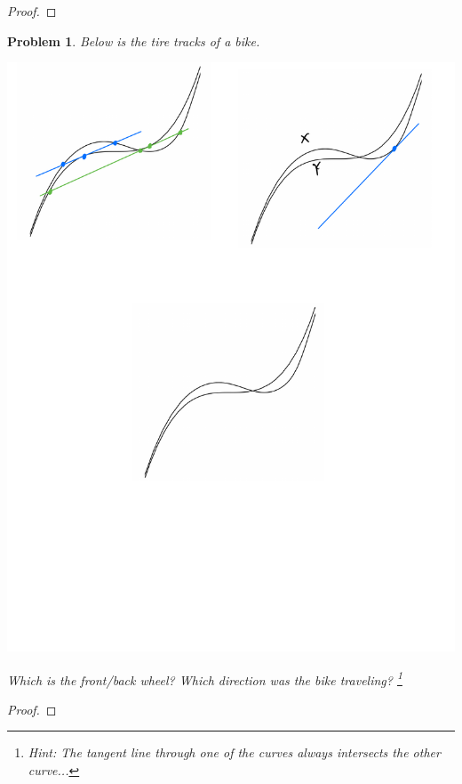\documentclass[11pt]{article}
\newtheorem{problem}{Problem}
\begin{document}
\begin{proof}

\end{proof}

\pagebreak


\begin{problem}
Below is the tire tracks of a bike. 
\begin{center}
\includegraphics{bike.pdf}
\end{center}
Which is the front/back wheel? Which direction was the bike traveling? \footnote{Hint: The tangent line through one of the curves always intersects the other curve...}
\end{problem}

\begin{proof}

\end{proof}
\end{document}
